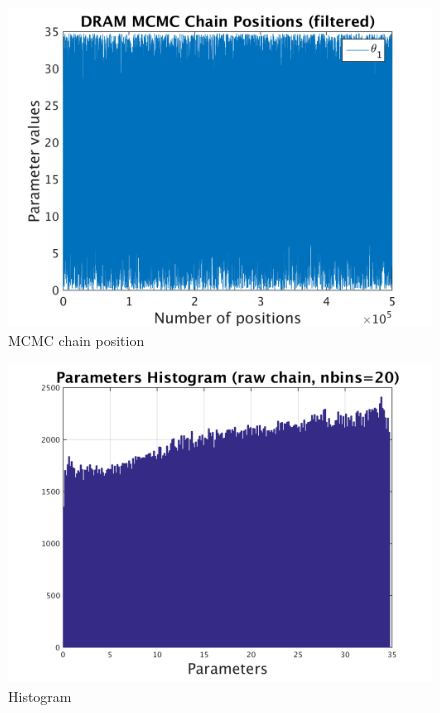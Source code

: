 \begin{figure}[h!]
  
  \centering
   \includegraphics[scale=0.75]{output_50/simple_ip_chain_pos_filt}
   \caption{MCMC chain position }
\end{figure}


\begin{figure}[h!]
  
  \centering
   \includegraphics[scale=0.75]{output_50/simple_ip_hist_raw}
   \caption{Histogram}
\end{figure}



